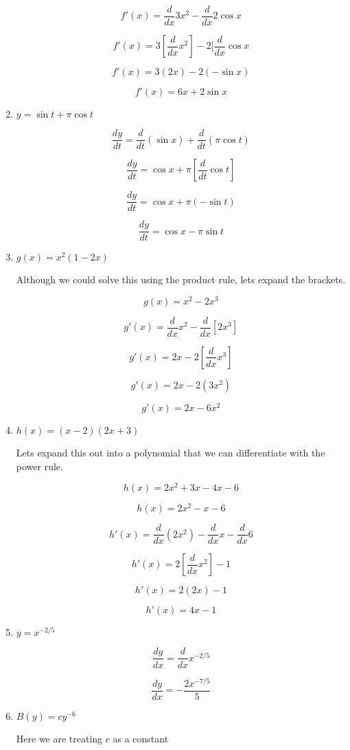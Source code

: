 \documentclass{article}
\begin{document}
\begin{enumerate}
			$$f'(x) = \frac{d}{dx} 3x^2 - \frac{d}{dx} 2\cos x$$

			$$f'(x) = 3 [\frac{d}{dx} x^2] - 2 [\frac{d}{dx} \cos x$$

			$$f'(x) = 3 (2x) - 2 (-\sin x)$$

			$$f'(x) = 6x + 2\sin x$$

		\item $y = \sin t + \pi \cos t$

			$$\frac{dy}{dt} = \frac{d}{dt} (\sin x) + \frac{d}{dt} (\pi \cos t)$$

			$$\frac{dy}{dt} = \cos x + \pi [\frac{d}{dt} \cos t]$$

			$$\frac{dy}{dt} = \cos x + \pi (- \sin t)$$

			$$\frac{dy}{dt} = \cos x - \pi \sin t$$

		\item $g(x) = x^2(1-2x)$

			Although we could solve this using the product rule, lets expand the brackets.

			$$g(x) = x^2 - 2x^3$$

			$$g'(x)  = \frac{d}{dx} x^2 - \frac{d}{dx} [2x^3]$$

			$$g'(x)  = 2x - 2 [\frac{d}{dx} x^3]$$

			$$g'(x) = 2x - 2 (3x^2)$$

			$$g'(x) = 2x - 6x^2$$

		\item $h(x) = (x-2)(2x + 3)$

			Lets expand this out into a polynomial that we can differentiate with the power rule.

			$$h(x) = 2x^2 + 3x - 4x - 6$$

			$$h(x) = 2x^2 - x - 6$$

			$$h'(x) = \frac{d}{dx} (2x^2) - \frac{d}{dx} x - \frac{d}{dx} 6$$

			$$h'(x) = 2 [ \frac{d}{dx}x^2] - 1$$

			$$h'(x) = 2(2x) - 1$$

			$$h'(x) = 4x - 1$$

		\item $y = x^{-2/5}$

			$$\frac{dy}{dx} = \frac{d}{dx} x^{-2/5}$$

			$$\frac{dy}{dx} = -\frac{2 x^{-7/5}}{5}$$

		\item $B(y) = cy^{-6}$

			Here we are treating $c$ as a constant


\end{enumerate}
\end{document}
